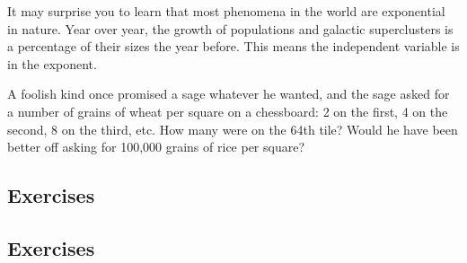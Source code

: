

It may surprise you to learn that most phenomena in the world are exponential in nature.
Year over year, the growth of populations and galactic superclusters is a percentage of 
their sizes the year before.  This means the independent variable is in the exponent.

A foolish kind once promised a sage whatever he wanted, and the sage asked for
a number of grains of wheat per square on a chessboard: 2 on the first, 4 on the second, 
8 on the third, etc.  How many were on the 64th tile?  Would he have been better off
asking for 100,000 grains of rice per square?

\newpage
\chapterminitoc

\newpage
{}
\newpage

\newpage
\subsection{Exercises}


\newpage
{}
\newpage

\newpage
\subsection{Exercises}
\noindent{}
\newpage
\noindent{}
\newpage
\noindent{}
\newpage
\noindent{}



\newpage
{}
\newpage

\newpage
